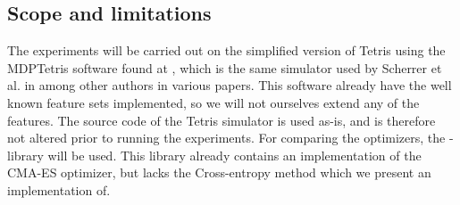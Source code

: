 \subsection{Scope and limitations \label{section:scope}}


The experiments will be carried out on the simplified version of
Tetris using the MDPTetris software found at \citep{mdptetris},
which is the same simulator used by Scherrer et al. in \citep{scherrer2009:b} 
among other authors in various papers.
This software already have the well known feature sets
implemented, so we will not ourselves extend any of the features.
The source code of the Tetris simulator is used as-is, and is therefore 
not altered prior to running the experiments. 
For comparing the optimizers, the \shark -library will be used. 
This library already contains an
implementation of the CMA-ES optimizer, but lacks the 
Cross-entropy method which we present an implementation of.




